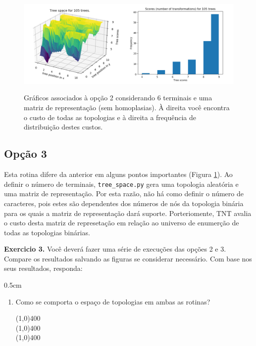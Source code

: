\begin{refsection}
  \begin{figure}[H]
  \centering
       \centering
      {\includegraphics[scale=0.65]{figures/tut3/opcao_3_6_terminals_24_characters.pdf}}
      {\caption[\textit{\textit{Structured space} }]{Gráficos associados à opção 2 considerando 6 terminais e uma matriz de representação (sem homoplasias). À direita você encontra o custo de todas as topologias e à direita a frequência de distribuição destes custos.}\label{tut3:fig:struc}}
  \end{figure}





\subsection{Opção 3}\label{tut3:subs:struc}

Esta rotina difere da anterior em alguns pontos importantes (Figura \ref{tut3:fig:struc}). Ao definir o número de terminais, \texttt{tree\_space.py} gera uma topologia aleatória e uma matriz de representação. Por esta razão, não há como definir o número de caracteres, pois estes são dependentes dos números de nós da topologia binária para os quais a matriz de representação dará suporte. Porteriomente, TNT avalia o custo desta matriz de represetação em relação ao universo de enumerção de todas as topologias binárias. \\


\begin{blackBlock}{\textbf{Exercicio 3.}}\label{tut3:ex:3.\arabic{ex}}
	Você deverá fazer uma série de execuções das opções 2 e 3. Compare os resultados salvando as figuras se considerar necessário. Com base nos seus resultados, responda:
\begin {myindentpar}{0.5cm}
\begin{enumerate}[\itshape i.]
 \item{Como se comporta o espaço de topologias em ambas as rotinas?}\label{tut3:ex3}\\
  \begin{center}
  \line(1,0){400}\\
  \line(1,0){400}\\
  \line(1,0){400}\\
  \end{center}


\end{enumerate}
\end{myindentpar}
\end{blackBlock}
\end{refsection}
